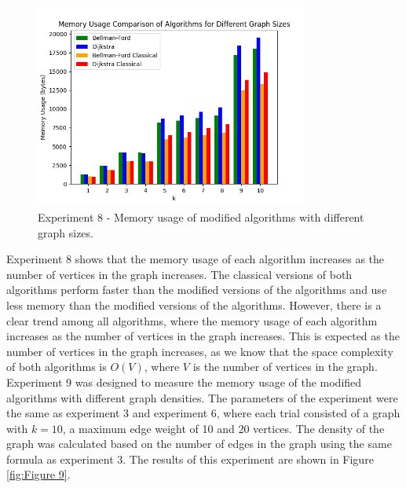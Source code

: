 \documentclass{article}
\begin{document}
\begin{onehalfspace}
\begin{figure}[H] 
    \centering
    \includegraphics[width=0.8\textwidth]{Figures/Memory_sizes.png} 
    \caption{\footnotesize Experiment 8 - Memory usage of modified algorithms with different graph sizes.}
    \label{fig:Figure 8} 
\end{figure}

Experiment 8 shows that the memory usage of each algorithm increases as the number of vertices
in the graph increases. The classical versions of both algorithms perform faster than the modified
versions of the algorithms and use less memory than the modified versions of the algorithms. 
However, there is a clear trend among all algorithms, where the memory usage of each algorithm
increases as the number of vertices in the graph increases. This is expected as the number of vertices in the graph increases, as we know that the space complexity of both algorithms is $O(V)$, where $V$ is the number of vertices in the graph.
\smallskip
\newline
\indent
Experiment 9 was designed to measure the memory usage of the modified algorithms with different graph densities. 
The parameters of the experiment were the same as experiment 3 and experiment 6, where each trial consisted of a graph with $k=10$, a maximum edge weight of 10 and 20 vertices. The density of the graph was calculated based on the number of edges in the graph using the same formula as experiment 3.
The results of this experiment are shown in Figure \ref{fig:Figure 9}.


\end{onehalfspace}
\end{document}
